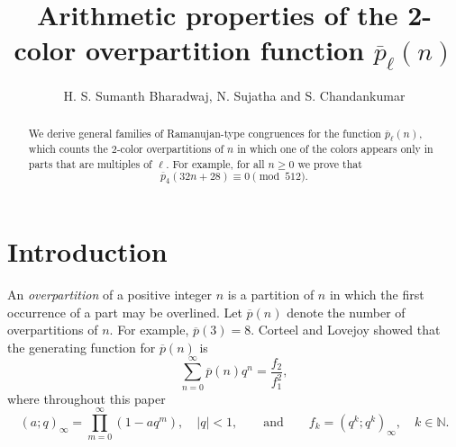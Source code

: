 \documentclass[11pt, reqno]{amsart}
\numberwithin{equation}{section}
\begin{document}
	\title[Arithmetic properties of the 2-color overpartition function $\overline{p}_\ell(n)$]{Arithmetic properties of the 2-color overpartition function $\overline{p}_\ell(n)$}
	\author{H. S. Sumanth Bharadwaj, N. Sujatha and S. Chandankumar}
	
	\address[H. S. Sumanth Bharadwaj]{Department of Mathematics and Statistics, Faculty of Natural Sciences, M. S. Ramaiah University of Applied Sciences, Peenya Campus, Peenya 4th Phase, Bengaluru-560 058, Karnataka, India.} 
	
	\address[N. Sujatha]{Department of Mathematics, B. M. S. College of Engineering, Bengaluru-560 004, Karnataka, India.} 
	
	\address[S. Chandankumar]{Department of Mathematics and Statistics, Faculty of Natural Sciences, M. S. Ramaiah University of Applied Sciences, Peenya Campus, Peenya 4th Phase, Bengaluru-560 058, Karnataka, India.} 
	
	 
	
	\maketitle
	\begin{abstract}
		We derive general families of Ramanujan-type congruences for the function $\overline{p}_{\ell}(n)$, which counts the $2$-color overpartitions of $n$ in which one of the colors appears only in parts that are multiples of $\ell$. For example, for all $n\geq0$ we prove that $$\overline{p}_{4}(32n+28)\equiv 0 \pmod{512}.$$
	\end{abstract}
	
	\section{Introduction}
	
	An \emph{overpartition} of a positive integer $n$ is a partition of $n$
	in which the first occurrence of a part may be overlined.
	Let $\overline{p}(n)$ denote the number of overpartitions of $n$.
	For example, $\overline{p}(3)=8.$ Corteel and Lovejoy \cite{CorteelLovejoy} showed that the generating
	function for $\overline{p}(n)$ is
	\[
	\sum_{n=0}^{\infty}\overline{p}(n)q^n
	=
	\frac{f_2}{f_1^2},
	\]
	where throughout this paper
	\[
	(a;q)_\infty
	=
	\prod_{m=0}^{\infty}(1-aq^m),
	\quad |q|<1,\qquad \mathrm{ and } \qquad f_k=(q^k;q^k)_\infty, \quad k\in \mathbb{N}.
	\]
	
\end{document}
